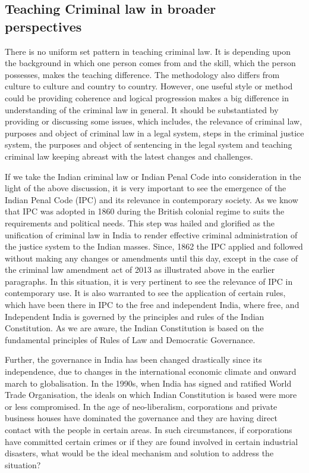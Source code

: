 \begin{multicols}{2}
\vspace{-.3cm}

\subsection{Teaching Criminal law in broader\\ perspectives}\label{subsection-2.2}

\vspace{-.2cm}

\noi
There is no uniform set pattern in teaching criminal law. It is depending upon the
background in which one person comes from and the skill, which the person
possesses, makes the teaching difference. The methodology also differs from culture
to culture and country to country. However, one useful style or method could be
providing coherence and logical progression makes a big difference in understanding
of the criminal law in general. It should be substantiated by providing or discussing
some issues, which includes, the relevance of criminal law, purposes and object of
criminal law in a legal system, steps in the criminal justice system, the purposes and
object of sentencing in the legal system and teaching criminal law keeping abreast
with the latest changes and challenges.

\noi
If we take the Indian criminal law or Indian Penal Code into consideration in the light
of the above discussion, it is very important to see the emergence of the Indian Penal
Code (IPC) and its relevance in contemporary society. As we know that IPC was
adopted in 1860 during the British colonial regime to suits the requirements and
political needs. This step was hailed and glorified as the unification of criminal law in
India to render effective criminal administration of the justice system to the Indian
masses. Since, 1862 the IPC applied and followed without making any changes or
amendments until this day, except in the case of the criminal law amendment act of
2013 as illustrated above in the earlier paragraphs. In this situation, it is very pertinent
to see the relevance of IPC in contemporary use. It is also warranted to see the
application of certain rules, which have been there in IPC to the free and independent
India, where free, and Independent India is governed by the principles and rules of the
Indian Constitution. As we are aware, the Indian Constitution is based on the
fundamental principles of Rules of Law and Democratic Governance.

\noi
Further, the governance in India has been changed drastically since its independence,
due to changes in the international economic climate and onward march to
globalisation. In the 1990s, when India has signed and ratified World Trade
Organisation, the ideals on which Indian Constitution is based were more or less
compromised. In the age of neo-liberalism, corporations and private business houses
have dominated the governance and they are having direct contact with the people in
certain areas. In such circumstances, if corporations have committed certain crimes or
if they are found involved in certain industrial disasters, what would be the ideal
mechanism and solution to address the situation?


\end{multicols}
